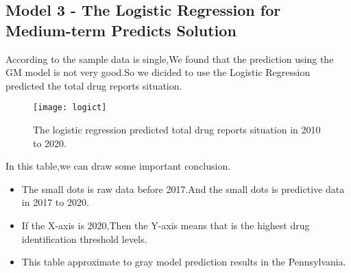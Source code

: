 \documentclass{mcmthesis}
\begin{document}
\subsection{Model 3 - The Logistic Regression for Medium-term  Predicts Solution} %
\noindent According to the sample data is single,We found that the prediction using the GM model is not very good.So we dicided to use the Logistic Regression predicted the total drug reports situation.%
\begin{figure}[!h] %
	\small
	\centering
	\texttt{[image: logict]}
	\caption{The logistic regression predicted total drug reports situation in 2010 to 2020. } %
	 \label{fig:Vis}
\end{figure}
In this table,we can draw some important conclusion.
\begin{itemize}
	\item The small dots is raw data before 2017.And the small dots is predictive data in 2017 to 2020.%
	\item If the X-axis is 2020,Then the Y-axis means that is the highest drug identification threshold levels. %
	\item This table approximate to gray model prediction results in the Pennsylvania.  %
\end{itemize}
\end{document}
